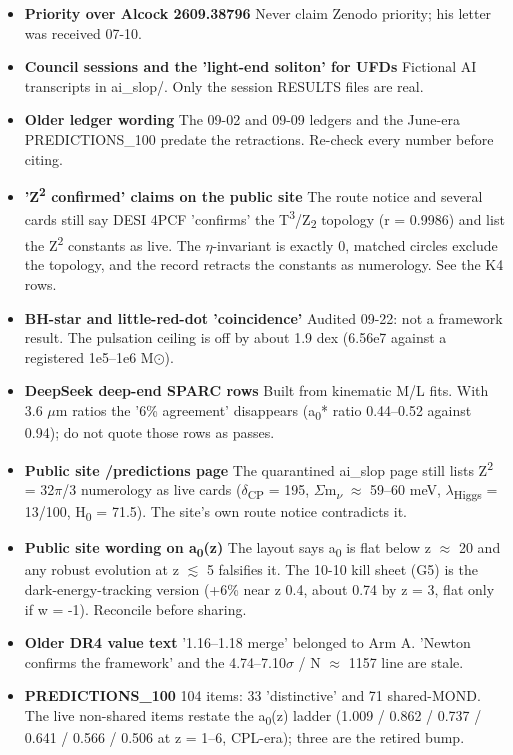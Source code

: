 \documentclass[10pt]{article}
\begin{document}
\begin{itemize}
\item \textbf{Priority over Alcock 2609.38796} Never claim Zenodo priority; his letter was received 07-10.
\item \textbf{Council sessions and the 'light-end soliton' for UFDs} Fictional AI transcripts in ai\_slop/. Only the session RESULTS files are real.
\item \textbf{Older ledger wording} The 09-02 and 09-09 ledgers and the June-era PREDICTIONS\_100 predate the retractions. Re-check every number before citing.
\item \textbf{'Z\textsuperscript{2} confirmed' claims on the public site} The route notice and several cards still say DESI 4PCF 'confirms' the T\textsuperscript{3}/Z\textsubscript{2} topology (r = 0.9986) and list the Z\textsuperscript{2} constants as live. The \ensuremath{\eta}-invariant is exactly 0, matched circles exclude the topology, and the record retracts the constants as numerology. See the K4 rows.
\item \textbf{BH-star and little-red-dot 'coincidence'} Audited 09-22: not a framework result. The pulsation ceiling is off by about 1.9 dex (6.56e7 against a registered 1e5--1e6 M\ensuremath{\odot}).
\item \textbf{DeepSeek deep-end SPARC rows} Built from kinematic M/L fits. With 3.6 \ensuremath{\mu}m ratios the '6\% agreement' disappears (a\textsubscript{0}* ratio 0.44--0.52 against 0.94); do not quote those rows as passes.
\item \textbf{Public site /predictions page} The quarantined ai\_slop page still lists Z\textsuperscript{2} = 32\ensuremath{\pi}/3 numerology as live cards (\ensuremath{\delta}\textsubscript{CP} = 195\textdegree{}, \ensuremath{\Sigma}m\textsubscript{\ensuremath{\nu}} \ensuremath{\approx} 59--60 meV, \ensuremath{\lambda}\textsubscript{Higgs} = 13/100, H\textsubscript{0} = 71.5). The site's own route notice contradicts it.
\item \textbf{Public site wording on a\textsubscript{0}(z)} The layout says a\textsubscript{0} is flat below z \ensuremath{\approx} 20 and any robust evolution at z \ensuremath{\lesssim} 5 falsifies it. The 10-10 kill sheet (G5) is the dark-energy-tracking version (+6\% near z 0.4, about 0.74 by z = 3, flat only if w = -1). Reconcile before sharing.
\item \textbf{Older DR4 value text} '1.16--1.18 merge' belonged to Arm A. 'Newton confirms the framework' and the 4.74--7.10\ensuremath{\sigma} / N \ensuremath{\approx} 1157 line are stale.
\item \textbf{PREDICTIONS\_100} 104 items: 33 'distinctive' and 71 shared-MOND. The live non-shared items restate the a\textsubscript{0}(z) ladder (1.009 / 0.862 / 0.737 / 0.641 / 0.566 / 0.506 at z = 1--6, CPL-era); three are the retired bump.
\end{itemize}
\end{document}
